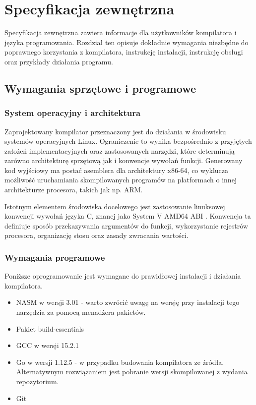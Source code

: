\chapter{Specyfikacja zewnętrzna}
\label{ch:04}

Specyfikacja zewnętrzna zawiera informacje dla użytkowników kompilatora i języka programowania. Rozdział ten opisuje dokładnie wymagania niezbędne do poprawnego korzystania z kompilatora, instrukcję instalacji, instrukcję obsługi oraz przykłady działania programu.

\section{Wymagania sprzętowe i programowe}

\subsection{System operacyjny i architektura}

Zaprojektowany kompilator przeznaczony jest do działania w środowisku systemów operacyjnych Linux. Ograniczenie to wynika bezpośrednio z przyjętych założeń implementacyjnych oraz zastosowanych narzędzi, które determinują zarówno architekturę sprzętową jak i konwencje wywołań funkcji. Generowany kod wyjściowy ma postać asemblera dla architektury x86-64, co wyklucza możliwość uruchamiania skompilowanych programów na platformach o innej architekturze procesora, takich jak np. ARM.

Istotnym elementem środowiska docelowego jest zastosowanie linuksowej konwencji wywołań języka C, znanej jako System V AMD64 ABI \cite{bib:system-v-amd64-abi}. Konwencja ta definiuje sposób przekazywania argumentów do funkcji, wykorzystanie rejestrów procesora, organizację stosu oraz zasady zwracania wartości.

\newpage
\subsection{Wymagania programowe}
\label{ch:04-wymagania-programowe}

Poniższe oprogramowanie jest wymagane do prawidłowej instalacji i działania kompilatora.
\begin{itemize}
    \item NASM w wersji 3.01 - warto zwrócić uwagę na wersję przy instalacji tego narzędzia za pomocą menadżera pakietów.
    \item Pakiet build-essentials
    \item GCC w wersji 15.2.1
    \item Go w wersji 1.12.5 - w przypadku budowania kompilatora ze źródła. Alternatywnym rozwiązaniem jest pobranie wersji skompilowanej z wydania repozytorium.
    \item Git
\end{itemize}

